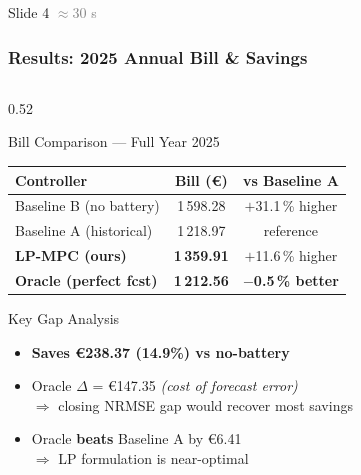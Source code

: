 \documentclass[aspectratio=169, 10pt]{beamer}
\newcommand{\good}[1]{\textcolor{greenok}{\textbf{#1}}}
\begin{document}
\begin{frame}{Slide 4 \hfill \textcolor{gray}{\small$\approx$30 s}}
  \frametitle{Results: 2025 Annual Bill \& Savings}

  \begin{columns}[T]
    \begin{column}{0.52\textwidth}
      \begin{block}{Bill Comparison --- Full Year 2025}
        \renewcommand{\arraystretch}{1.3}
        \small
        \begin{tabular}{lcc}
          \toprule
          \textbf{Controller} & \textbf{Bill (\euro)} & \textbf{vs Baseline A} \\
          \midrule
          Baseline B (no battery) & 1\,598.28 & $+$31.1\,\% higher \\
          Baseline A (historical) & 1\,218.97 & reference \\
          \rowcolor{solaryellow!30}
          \textbf{LP-MPC (ours)}  & \textbf{1\,359.91} & $+$11.6\,\% higher \\
          \good{Oracle (perfect fcst)}   & \good{1\,212.56} & \good{$-$0.5\,\% better} \\
          \bottomrule
        \end{tabular}
      \end{block}

      \vspace{4pt}
      \begin{alertblock}{Key Gap Analysis}
        \small
        \begin{itemize}
          \item \good{Saves \euro238.37 (14.9\%) vs no-battery}
          \item Oracle $\Delta$ = \euro147.35 \textit{(cost of forecast error)}\\
                $\Rightarrow$ closing NRMSE gap would recover most savings
          \item Oracle \textbf{beats} Baseline A by \euro6.41\\
                $\Rightarrow$ LP formulation is near-optimal
        \end{itemize}
      \end{alertblock}
    \end{column}


\end{columns}
\end{frame}
\end{document}
